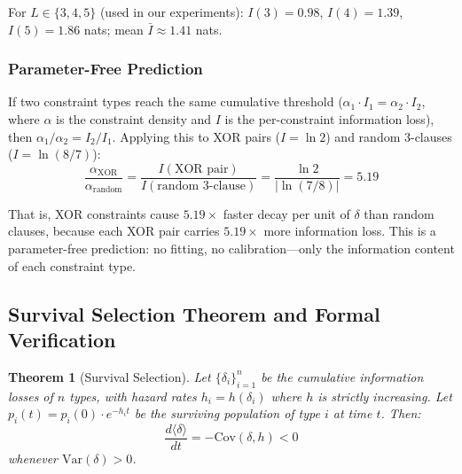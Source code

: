 \documentclass[11pt,a4paper]{article}
\newtheorem{theorem}{Theorem}[section]
\begin{document}
For $L \in \{3, 4, 5\}$ (used in our experiments): $I(3) = 0.98$, $I(4) = 1.39$, $I(5) = 1.86$ nats; mean $\bar{I} \approx 1.41$ nats.

\subsubsection{Parameter-Free Prediction}

If two constraint types reach the same cumulative threshold ($\alpha_1 \cdot I_1 = \alpha_2 \cdot I_2$, where $\alpha$ is the constraint density and $I$ is the per-constraint information loss), then $\alpha_1 / \alpha_2 = I_2 / I_1$. Applying this to XOR pairs ($I = \ln 2$) and random 3-clauses ($I = \ln(8/7)$):
\begin{equation}
\frac{\alpha_{\text{XOR}}}{\alpha_{\text{random}}} = \frac{I(\text{XOR pair})}{I(\text{random 3-clause})} = \frac{\ln 2}{|\ln(7/8)|} = 5.19
\label{eq:ratio-prediction}
\end{equation}

That is, XOR constraints cause $5.19\times$ faster decay per unit of $\delta$ than random clauses, because each XOR pair carries $5.19\times$ more information loss. This is a parameter-free prediction: no fitting, no calibration---only the information content of each constraint type.

\subsection{Survival Selection Theorem and Formal Verification}
\label{sec:h-theorem}

\begin{theorem}[Survival Selection]
\label{thm:h}
Let $\{\delta_i\}_{i=1}^{n}$ be the cumulative information losses of $n$ types, with hazard rates $h_i = h(\delta_i)$ where $h$ is strictly increasing. Let $p_i(t) = p_i(0) \cdot e^{-h_i t}$ be the surviving population of type $i$ at time $t$. Then:
\[
\frac{d\langle\delta\rangle}{dt} = -\mathrm{Cov}(\delta, h) < 0
\]
whenever $\mathrm{Var}(\delta) > 0$.
\end{theorem}
\end{document}
